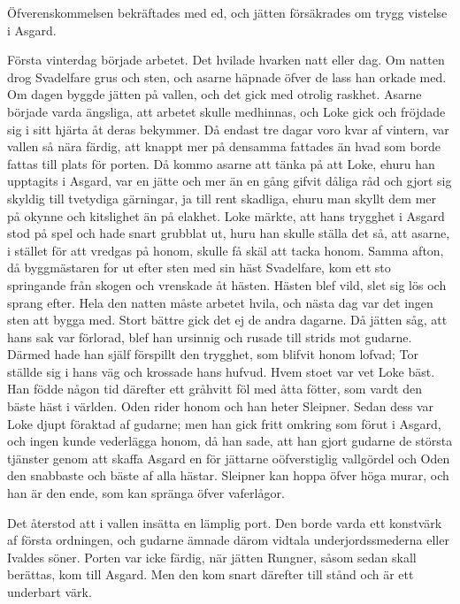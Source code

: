 Öfverenskommelsen bekräftades med ed, och jätten försäkrades om trygg
vistelse i Asgard.

Första vinterdag började arbetet. Det hvilade hvarken
\protect\hypertarget{lb1625905.xhtmlux5cux23start60}{}{}\protect\hypertarget{lb1625905.xhtmlux5cux23start60-a}{}{}\protect\hypertarget{lb1625905.xhtmlux5cux23start60-b}{}{}\protect\hypertarget{lb1625905.xhtmlux5cux23start60-c}{}{}\protect\hypertarget{lb1625905.xhtmlux5cux23start60-d}{}{}
natt eller dag. Om natten drog Svadelfare grus och sten, och asarne
häpnade öfver de lass han orkade med. Om dagen byggde jätten på vallen,
och det gick med otrolig raskhet. Asarne började varda ängsliga, att
arbetet skulle medhinnas, och Loke gick och fröjdade sig i sitt hjärta
åt deras bekymmer. Då endast tre dagar voro kvar af vintern, var vallen
så nära färdig, att knappt mer på densamma fattades än hvad som borde
fattas till plats för porten. Då kommo asarne att tänka på att Loke,
ehuru han upptagits i Asgard, var en jätte och mer än en gång gifvit
dåliga råd och gjort sig skyldig till tvetydiga gärningar, ja till rent
skadliga, ehuru man skyllt dem mer på okynne och kitslighet än på
elakhet. Loke märkte, att hans trygghet i Asgard stod på spel och hade
snart grubblat ut, huru han skulle ställa det så, att asarne, i stället
för att vredgas på honom, skulle få skäl att tacka honom. Samma afton,
då byggmästaren for ut efter sten med sin häst Svadelfare, kom ett sto
springande från skogen och vrenskade åt hästen. Hästen blef vild, slet
sig lös och sprang efter. Hela den natten måste arbetet hvila, och nästa
dag var det ingen sten att bygga med. Stort bättre gick det ej de andra
dagarne. Då jätten såg, att hans sak var förlorad, blef han ursinnig och
rusade till strids mot gudarne. Därmed hade han själf förspillt den
trygghet, som blifvit honom lofvad; Tor ställde sig i hans väg och
krossade hans hufvud. Hvem stoet var vet Loke bäst. Han födde någon tid
därefter ett gråhvitt föl med åtta fötter, som vardt den bäste häst i
världen. Oden rider honom och han heter Sleipner. Sedan dess var Loke
djupt föraktad af gudarne; men han gick fritt omkring som förut i
Asgard, och ingen kunde vederlägga honom, då han sade, att han gjort
gudarne de största tjänster genom att skaffa Asgard en för jättarne
oöfverstiglig vallgördel och Oden den snabbaste och bäste af alla
hästar. Sleipner kan hoppa öfver höga murar, och han är den ende, som
kan spränga öfver vaferlågor.

Det återstod att i vallen insätta en lämplig port. Den
\protect\hypertarget{lb1625905.xhtmlux5cux23start61}{}{}\protect\hypertarget{lb1625905.xhtmlux5cux23start61-a}{}{}\protect\hypertarget{lb1625905.xhtmlux5cux23start61-b}{}{}\protect\hypertarget{lb1625905.xhtmlux5cux23start61-c}{}{}\protect\hypertarget{lb1625905.xhtmlux5cux23start61-d}{}{}
borde varda ett konstvärk af första ordningen, och gudarne ämnade därom
vidtala underjordssmederna eller Ivaldes söner. Porten var icke färdig,
när jätten Rungner, såsom sedan skall berättas, kom till Asgard. Men den
kom snart därefter till stånd och är ett underbart värk.

